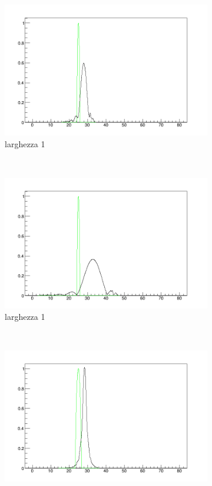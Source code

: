 \begin{figure}[htb]
	\centering
	\begin{subfigure}[b]{0.23\textwidth}
		\includegraphics[width=\textwidth]{IMG/bump1-1}
		\caption{larghezza 1}
	\end{subfigure}
	~
	\begin{subfigure}[b]{0.23\textwidth}
		\includegraphics[width=\textwidth]{IMG/bump1-2}
		\caption{larghezza 1}
	\end{subfigure}
	~
	\begin{subfigure}[b]{0.23\textwidth}
		\includegraphics[width=\textwidth]{IMG/bump2-1}

\end{subfigure}
\end{figure}
